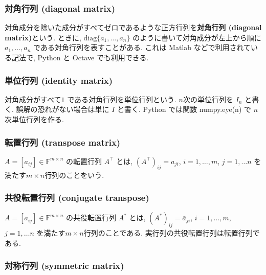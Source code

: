 \documentclass[a4paper]{scrbook}
\theoremstyle{definition}
\begin{document}
\subsubsection*{対角行列 (diagonal matrix)}\label{-diagonal-matrix}

対角成分を除いた成分がすべてゼロであるような正方行列を\textbf{対角行列
(diagonal matrix)}という. ときに, \(\mathrm{diag}\{a_{1},\dots,a_{n}\}\)
のように書いて対角成分が左上から順に \(a_{1},\dots,a_{n}\)
である対角行列を表すことがある. これは Matlab
などで利用されている記法で, Python と Octave でも利用できる.

\subsubsection*{単位行列 (identity matrix)}\label{-identity-matrix}

対角成分がすべて\(1\) である対角行列を単位行列という.
\(n\)次の単位行列を \(I_{n}\) と書く. 誤解の恐れがない場合は単に \(I\)
と書く. Python では関数 numpy.eye(n) で \(n\) 次単位行列を作る.

\subsubsection*{転置行列 (transpose matrix)}\label{-transpose-matrix}

\(A=[a_{ij}]\in\mathbb{F}^{m\times n}\) の転置行列 \(A^{\top}\) とは,
\((A^{\top})_{ij}=a_{ji}\), \(i=1,\dots,m\), \(j=1,\dots n\)
を満たす\(m\times n\)行列のことをいう.

\subsubsection*{共役転置行列 (conjugate
transpose)}\label{-conjugate-transpose}

\(A=[a_{ij}]\in\mathbb{F}^{m\times n}\) の共役転置行列 \(A^{*}\) とは,
\((A^{*})_{ij}=\bar{a}_{ji}\), \(i=1,\dots,m\), \(j=1,\dots n\)
を満たす\(m\times n\)行列のことである.
実行列の共役転置行列は転置行列である.

\subsubsection*{対称行列 (symmetric matrix)}\label{-symmetric-matrix}
\end{document}
